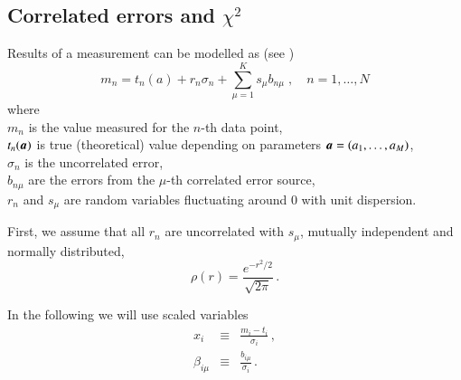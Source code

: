 

\newcommand{\rs}{s}
\newcommand{\ce}{b}
\DeclareRobustCommand\Vstat{\ensuremath{V^{\mathrm{(unc)}}}\ssp}
\DeclareRobustCommand\Vsys{\ensuremath{V^{\mathrm{(cor)}}}\ssp}
\DeclareRobustCommand\mb[1]{\ensuremath{\mbox{\mathversion{bold}{$#1$}}}\ssp}
\DeclareRobustCommand\mbs[1]{\ensuremath{\mbox{\mathversion{bold}{\scriptsize $#1$}}}\ssp}

\subsection {Correlated errors and \texorpdfstring{$\chi^2$}{chi2}}
\label{sec:cor-chi2}

Results of a measurement can be modelled as
(see \eg \cite{Stump:2001gu,Botje:2001fx})
\begin{equation}
m_n = t_n(a) + r_n \sigma_n + \sum_{\mu=1}^K \rs_\mu \ce_{n\mu}
\;,\quad n=1,\dots,N
\end{equation}
where\\
$m_n$ is the value measured for the $n$-th data point,\\
$t_n(\mb a)$ is true (theoretical) value depending on parameters $\mb a = (a_1,\dots, a_M)$,\\
$\sigma_n$ is the uncorrelated error,\\
$\ce_{n\mu}$ are the errors from the $\mu$-th correlated error source,\\
$r_n$ and $\rs_\mu$ are random variables fluctuating around 0 with unit dispersion.

First, we assume that all $r_n$ are uncorrelated with $\rs_\mu$,
mutually independent and normally distributed,
\begin{equation}
\rho(r) = \frac{e^{-r^2/2}}{\sqrt{2\pi}}
\,.
\end{equation}

In the following we will use scaled variables
\begin{subequations}
\begin{eqnarray}
x_i &\equiv& \frac{m_i-t_i}{\sigma_i}
\,,
\\
\beta_{i\mu} &\equiv& \frac{\ce_{i\mu}}{\sigma_i}
\,.
\end{eqnarray}
\end{subequations}

